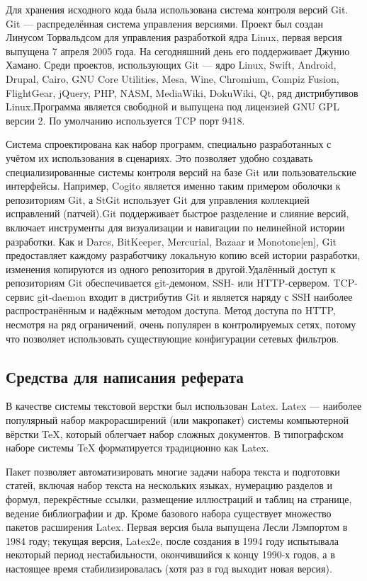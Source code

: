 Для хранения исходного кода была использована система контроля версий Git. Git — распределённая система управления версиями. Проект был создан Линусом Торвальдсом для управления разработкой ядра Linux, первая версия выпущена 7 апреля 2005 года. На сегодняшний день его поддерживает Джунио Хамано. Среди проектов, использующих Git — ядро Linux, Swift, Android, Drupal, Cairo, GNU Core Utilities, Mesa, Wine, Chromium, Compiz Fusion, FlightGear, jQuery, PHP, NASM, MediaWiki, DokuWiki, Qt, ряд дистрибутивов Linux.Программа является свободной и выпущена под лицензией GNU GPL версии 2. По умолчанию используется TCP порт 9418.

Система спроектирована как набор программ, специально разработанных с учётом их использования в сценариях. Это позволяет удобно создавать специализированные системы контроля версий на базе Git или пользовательские интерфейсы. Например, Cogito является именно таким примером оболочки к репозиториям Git, а StGit использует Git для управления коллекцией исправлений (патчей).Git поддерживает быстрое разделение и слияние версий, включает инструменты для визуализации и навигации по нелинейной истории разработки. Как и Darcs, BitKeeper, Mercurial, Bazaar и Monotone[en], Git предоставляет каждому разработчику локальную копию всей истории разработки, изменения копируются из одного репозитория в другой.Удалённый доступ к репозиториям Git обеспечивается git-демоном, SSH- или HTTP-сервером. TCP-сервис git-daemon входит в дистрибутив Git и является наряду с SSH наиболее распространённым и надёжным методом доступа. Метод доступа по HTTP, несмотря на ряд ограничений, очень популярен в контролируемых сетях, потому что позволяет использовать существующие конфигурации сетевых фильтров.

\subsection{Средства для написания реферата}
В качестве системы текстовой верстки был использован Latex. Latex — наиболее популярный набор макрорасширений (или макропакет) системы компьютерной вёрстки TeX, который облегчает набор сложных документов. В типографском наборе системы TeX форматируется традиционно как Latex.

Пакет позволяет автоматизировать многие задачи набора текста и подготовки статей, включая набор текста на нескольких языках, нумерацию разделов и формул, перекрёстные ссылки, размещение иллюстраций и таблиц на странице, ведение библиографии и др. Кроме базового набора существует множество пакетов расширения Latex. Первая версия была выпущена Лесли Лэмпортом в 1984 году; текущая версия, Latex2e, после создания в 1994 году испытывала некоторый период нестабильности, окончившийся к концу 1990-х годов, а в настоящее время стабилизировалась (хотя раз в год выходит новая версия).

